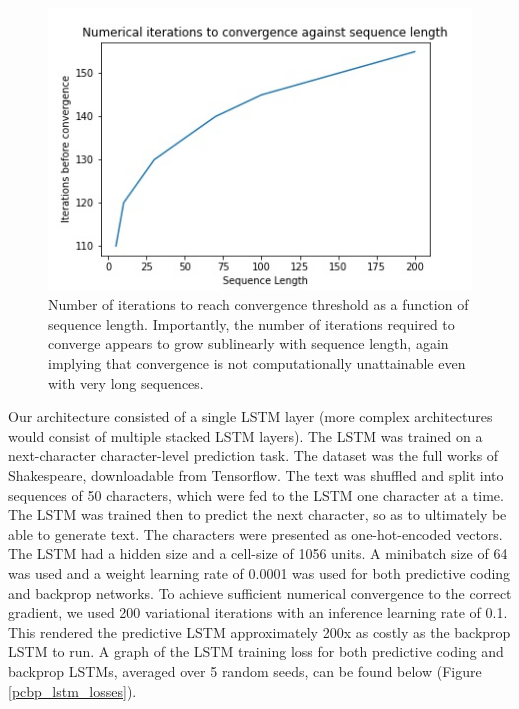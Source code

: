 \begin{figure}[ht]
  \centering
  \includegraphics[width=.9\linewidth]{chapter_6_figures/convergence_num_iterations_comparison.jpg}  
\caption{Number of iterations to reach convergence threshold as a function of sequence length. Importantly, the number of iterations required to converge appears to grow sublinearly with sequence length, again implying that convergence is not computationally unattainable even with very long sequences.}
\label{num_iterations_to_converge}
\end{figure}

Our architecture consisted of a single LSTM layer (more complex architectures would consist of multiple stacked LSTM layers).
The LSTM was trained on a next-character character-level prediction task. The dataset was the full works of Shakespeare, downloadable from Tensorflow. The text was shuffled and split into sequences of 50 characters, which were fed to the LSTM one character at a time. The LSTM was trained then to predict the next character, so as to ultimately be able to generate text. The characters were presented as one-hot-encoded vectors. The LSTM had a hidden size and a cell-size of 1056 units. A minibatch size of 64 was used and a weight learning rate of 0.0001 was used for both predictive coding and backprop networks. To achieve sufficient numerical convergence to the correct gradient, we used 200 variational iterations with an inference learning rate of 0.1. This rendered the predictive LSTM approximately 200x as costly as the backprop LSTM to run. A graph of the LSTM training loss for both predictive coding and backprop LSTMs, averaged over 5 random seeds, can be found below (Figure \ref{pcbp_lstm_losses}). 


